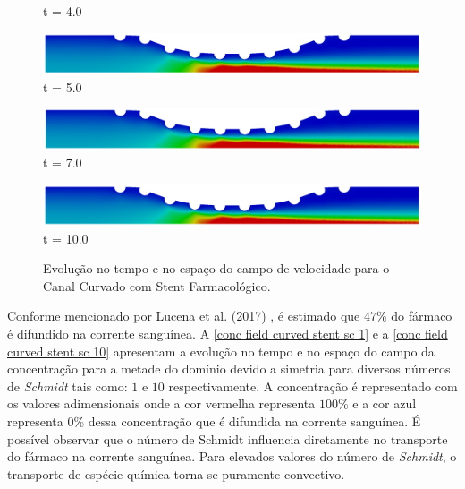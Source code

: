 \begin{figure}[H]
\begin{minipage}{.50\linewidth}
      t = 4.0
     \end{minipage}%
     \begin{minipage}{.50\linewidth}
      \centering
      \includegraphics[scale=0.12]{./02_chaps/cap_solution/figure/vel_CurvedStrut10000.png}\\
      t = 5.0
     \end{minipage}
     \begin{minipage}{.50\linewidth}
     \medskip
      \centering
      \includegraphics[scale=0.12]{./02_chaps/cap_solution/figure/vel_CurvedStrut14000.png}\\
      t = 7.0
     \end{minipage}%
     \begin{minipage}{.50\linewidth}
     \medskip
      \centering
      \includegraphics[scale=0.12]{./02_chaps/cap_solution/figure/vel_CurvedStrut20000.png}\\
      t = 10.0
     \end{minipage}
     \medskip
     \caption{Evolução no tempo e no espaço do campo de velocidade para o Canal Curvado com Stent Farmacológico.}
     \label{velocity field curved stent}
\end{figure}


\vspace{1cm}
Conforme mencionado por Lucena et al. (2017) \cite{lucena2017}, é estimado que $47$\% do fármaco é difundido na corrente sanguínea.
A \ref{conc field curved stent sc 1} e a \ref{conc field curved stent sc 10} 
apresentam a evolução no tempo e no espaço
do campo da concentração para a metade do domínio devido a simetria para diversos números de \textit{Schmidt}
tais como: $1$ e $10$ respectivamente.
A concentração é representado com os valores adimensionais
onde a cor vermelha representa $100$\% e a cor azul representa $0$\% 
dessa concentração que é difundida na corrente sanguínea. 
É possível observar que o número de Schmidt influencia
diretamente no transporte do fármaco na corrente sanguínea. Para elevados valores do
número de \textit{Schmidt}, o transporte de espécie química torna-se puramente convectivo.

